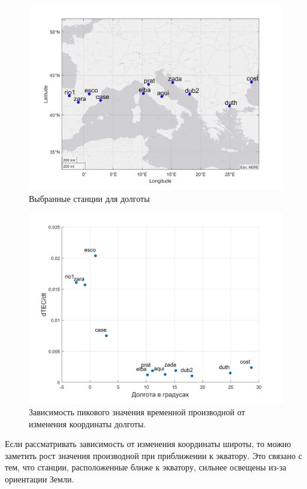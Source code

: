 \documentclass[a4paper]{article}
\begin{document}
\begin{figure}[H]
\centering
\includegraphics[width = 1\linewidth]{pics/clean_pics/lonStations.png}
\caption{Выбранные станции для долготы}
\label{stationslon}
\end{figure}

\begin{figure}[H]
\centering
\includegraphics[width = 1\linewidth]{pics/clean_pics/dtec_lon.png}
\caption{Зависимость пикового значения временной производной от изменения координаты долготы.}
\label{dteclon}
\end{figure}

Если рассматривать зависимость от изменения координаты широты, то можно заметить рост значения производной при приближении к экватору. Это связано с тем, что станции, расположенные ближе к экватору, сильнее освещены из-за ориентации Земли.
\end{document}
